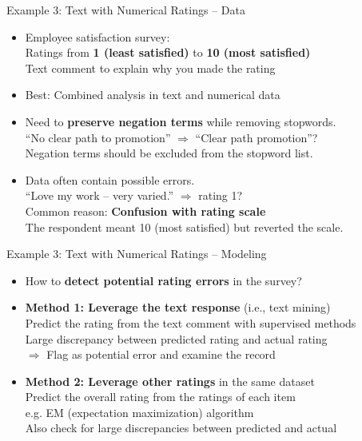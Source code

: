 \documentclass{beamer}
\renewcommand{\cite}{\citep}
\begin{document}
\begin{frame}{Example 3: Text with Numerical Ratings -- Data}
\begin{itemize}
\item Employee satisfaction survey:~\cite{Chai2019Text}\\
	Ratings from \textbf{1 (least satisfied)} to \textbf{10 (most satisfied)}\\
	Text comment to explain why you made the rating
\item Best: Combined analysis in text and numerical data
	\bigskip
\item Need to \textbf{preserve negation terms} while removing stopwords.\\
	``No clear path to promotion'' $\Rightarrow$ ``Clear path promotion''?\\
	Negation terms should be excluded from the stopword list.
	\bigskip
\item Data often contain possible errors.\\ 
	``Love my work -- very varied.'' $\Rightarrow$ rating 1?\\
	Common reason: \textbf{Confusion with rating scale}~\cite{fisher2013analytics}\\
	The respondent meant 10 (most satisfied) but reverted the scale.
\end{itemize}
\end{frame}

\begin{frame}{Example 3: Text with Numerical Ratings -- Modeling}
\begin{itemize}
\item How to \textbf{detect potential rating errors} in the survey?
	\bigskip
\item \textbf{Method 1: Leverage the text response} (i.e., text mining)\\
	Predict the rating from the text comment with supervised methods\\
	Large discrepancy between predicted rating and actual rating\\
	$\Rightarrow$ Flag as potential error and examine the record
	\bigskip
\item \textbf{Method 2: Leverage other ratings} in the same dataset\\
	Predict the overall rating from the ratings of each item\\
	e.g. EM (expectation maximization) algorithm{\footnotesize~\cite{fisher2011getting}}\\
	Also check for large discrepancies between predicted and actual 
\end{itemize}
\end{frame}
\end{document}
